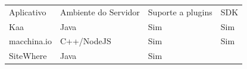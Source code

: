 \begin{longtable}[c]{@{}llll@{}}
\toprule\addlinespace
\begin{minipage}[b]{0.22\columnwidth}\raggedright
Aplicativo
\end{minipage} & \begin{minipage}[b]{0.28\columnwidth}\raggedright
Ambiente do Servidor
\end{minipage} & \begin{minipage}[b]{0.25\columnwidth}\raggedright
Suporte a plugins
\end{minipage} & \begin{minipage}[b]{0.12\columnwidth}\raggedright
SDK
\end{minipage}
\\\addlinespace
\midrule\endhead
\begin{minipage}[t]{0.22\columnwidth}\raggedright
Kaa
\end{minipage} & \begin{minipage}[t]{0.28\columnwidth}\raggedright
Java
\end{minipage} & \begin{minipage}[t]{0.25\columnwidth}\raggedright
Sim
\end{minipage} & \begin{minipage}[t]{0.12\columnwidth}\raggedright
Sim
\end{minipage}
\\\addlinespace
\begin{minipage}[t]{0.22\columnwidth}\raggedright
macchina.io
\end{minipage} & \begin{minipage}[t]{0.28\columnwidth}\raggedright
C++/NodeJS
\end{minipage} & \begin{minipage}[t]{0.25\columnwidth}\raggedright
Sim
\end{minipage} & \begin{minipage}[t]{0.12\columnwidth}\raggedright
Sim
\end{minipage}
\\\addlinespace
\begin{minipage}[t]{0.22\columnwidth}\raggedright
SiteWhere
\end{minipage} & \begin{minipage}[t]{0.28\columnwidth}\raggedright
Java
\end{minipage} & \begin{minipage}[t]{0.25\columnwidth}\raggedright
Sim
\end{minipage} & \begin{minipage}[t]{0.12\columnwidth}\raggedright

\end{minipage}
\end{longtable}
